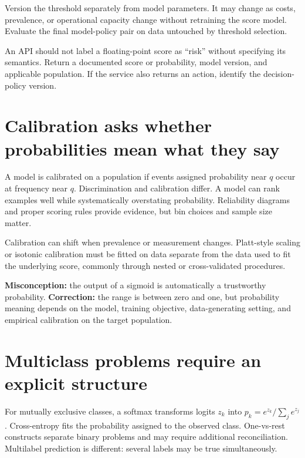 Version the threshold separately from model parameters. It may change as costs,
prevalence, or operational capacity change without retraining the score model.
Evaluate the final model-policy pair on data untouched by threshold selection.

\begin{professionalbox}
An API should not label a floating-point score as ``risk'' without specifying
its semantics. Return a documented score or probability, model version, and
applicable population. If the service also returns an action, identify the
decision-policy version.
\end{professionalbox}

\section{Calibration asks whether probabilities mean what they say}

A model is calibrated on a population if events assigned probability near
$q$ occur at frequency near $q$. Discrimination and calibration differ. A
model can rank examples well while systematically overstating probability.
Reliability diagrams and proper scoring rules provide evidence, but bin choices
and sample size matter.

Calibration can shift when prevalence or measurement changes. Platt-style
scaling or isotonic calibration must be fitted on data separate from the data
used to fit the underlying score, commonly through nested or cross-validated
procedures.

\begin{misconceptionbox}
\textbf{Misconception:} the output of a sigmoid is automatically a trustworthy
probability. \textbf{Correction:} the range is between zero and one, but
probability meaning depends on the model, training objective, data-generating
setting, and empirical calibration on the target population.
\end{misconceptionbox}

\section{Multiclass problems require an explicit structure}

For mutually exclusive classes, a softmax transforms logits $z_k$ into
$p_k=e^{z_k}/\sum_j e^{z_j}$. Cross-entropy fits the probability assigned to the
observed class. One-vs-rest constructs separate binary problems and may require
additional reconciliation. Multilabel prediction is different: several labels
may be true simultaneously.

